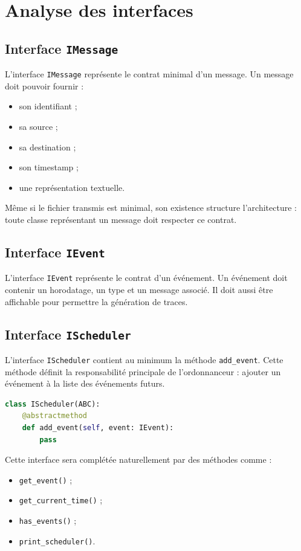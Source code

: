 \documentclass{article}
\begin{document}
\section{Analyse des interfaces}

\subsection{Interface \texttt{IMessage}}

L’interface \texttt{IMessage} représente le contrat minimal d’un message. Un message doit pouvoir fournir :
\begin{itemize}[leftmargin=*]
    \item son identifiant ;
    \item sa source ;
    \item sa destination ;
    \item son timestamp ;
    \item une représentation textuelle.
\end{itemize}

Même si le fichier transmis est minimal, son existence structure l’architecture : toute classe représentant un message doit respecter ce contrat.

\subsection{Interface \texttt{IEvent}}

L’interface \texttt{IEvent} représente le contrat d’un événement. Un événement doit contenir un horodatage, un type et un message associé. Il doit aussi être affichable pour permettre la génération de traces.

\subsection{Interface \texttt{IScheduler}}

L’interface \texttt{IScheduler} contient au minimum la méthode \texttt{add\_event}. Cette méthode définit la responsabilité principale de l’ordonnanceur : ajouter un événement à la liste des événements futurs.

\begin{lstlisting}[language=Python, caption=Extrait de IScheduler]
class IScheduler(ABC):
    @abstractmethod
    def add_event(self, event: IEvent):
        pass
\end{lstlisting}

Cette interface sera complétée naturellement par des méthodes comme :
\begin{itemize}[leftmargin=*]
    \item \texttt{get\_event()} ;
    \item \texttt{get\_current\_time()} ;
    \item \texttt{has\_events()} ;
    \item \texttt{print\_scheduler()}.
\end{itemize}
\end{document}
